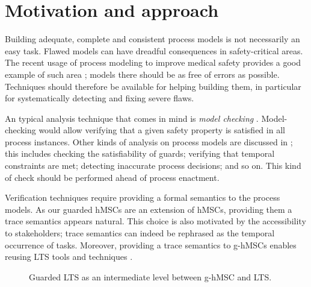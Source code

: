 \section{Motivation and approach\label{section:deductive-motivation}}

Building adequate, complete and consistent process models is not necessarily an easy task. Flawed models can have dreadful consequences in safety-critical areas. The recent usage of process modeling to improve medical safety provides a good example of such area \cite{Clarke:2008, Grando:2009, Damas:2011}; models there should be as free of errors as possible. Techniques should therefore be available for helping building them, in particular for systematically detecting and fixing severe flaws.

An typical analysis technique that comes in mind is \emph{model checking} \cite{Clarke:1989}. Model-checking would allow verifying that a given safety property is satisfied in all process instances. Other kinds of analysis on process models are discussed in \cite{Damas:2011}; this includes checking the satisfiability of guards; verifying that temporal constraints are met; detecting inaccurate process decisions; and so on. This kind of check should be performed ahead of process enactment.

Verification techniques require providing a formal semantics to the process models. As our guarded hMSCs are an extension of hMSCs, providing them a trace semantics appears natural. This choice is also motivated by the accessibility to stakeholders; trace semantics can indeed be rephrased as the temporal occurrence of tasks. Moreover, providing a trace semantics to g-hMSCs enables reusing LTS tools and techniques \cite{Magee:1999, Giannakopoulou:2003}.

\begin{figure}\centering
{}
\caption{Guarded LTS as an intermediate level between g-hMSC and LTS.\label{image:deductive-chapter-overview}}
\end{figure}

